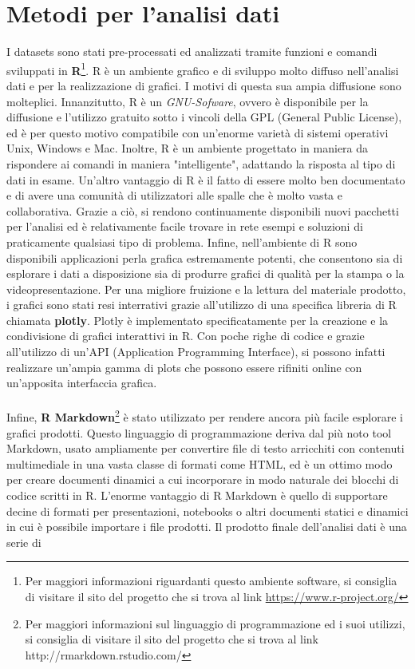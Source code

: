 \documentclass[a4paper,10pt]{scrartcl}
\begin{document}
\section{Metodi per l'analisi dati}
I datasets sono stati pre-processati ed analizzati tramite funzioni e comandi sviluppati in \textbf{R}\footnote{Per maggiori informazioni riguardanti questo ambiente software, si consiglia di visitare il sito del progetto che si trova al link \url{https://www.r-project.org/}}. R è un ambiente grafico e di sviluppo molto diffuso nell'analisi dati e per la realizzazione di grafici. I motivi di questa sua ampia diffusione sono molteplici. Innanzitutto, R è un \textit{GNU-Sofware}, ovvero è disponibile per la diffusione e l'utilizzo gratuito sotto i vincoli della GPL (General Public License), ed è per questo motivo compatibile con un'enorme varietà di sistemi operativi Unix, Windows e Mac. Inoltre, R è un ambiente progettato in maniera da rispondere ai comandi in maniera "intelligente", adattando la risposta al tipo di dati in esame. Un'altro vantaggio di R è il fatto di essere molto ben documentato e di avere una comunità di utilizzatori alle spalle che è molto vasta e collaborativa. Grazie a ciò, si rendono continuamente disponibili nuovi pacchetti per l'analisi ed è relativamente facile trovare in rete esempi e soluzioni di praticamente qualsiasi tipo di problema. Infine, nell'ambiente di R sono disponibili applicazioni perla grafica estremamente potenti, che consentono sia di esplorare i dati a disposizione sia di produrre grafici di qualità per la stampa o la videopresentazione. Per una migliore fruizione e la lettura del materiale prodotto, i grafici sono stati resi interrativi grazie all'utilizzo di una specifica libreria di R chiamata \textbf{plotly}. Plotly è implementato specificatamente per la creazione e la condivisione di grafici interattivi in R. Con poche righe di codice e grazie all'utilizzo di un'API (Application Programming Interface), si possono infatti realizzare un'ampia gamma di plots che possono essere rifiniti online con un'apposita interfaccia grafica.
\\ \\
Infine, \textbf{R Markdown}\footnote{Per maggiori informazioni sul linguaggio di programmazione ed i suoi utilizzi, si consiglia di visitare il sito del progetto che si trova al link http://rmarkdown.rstudio.com/} è stato utilizzato per rendere ancora più facile esplorare i grafici prodotti. Questo linguaggio di programmazione deriva dal più noto tool Markdown, usato ampliamente per convertire file di testo arricchiti con contenuti multimediale in una vasta classe di formati come HTML, ed è un ottimo modo per creare documenti dinamici a cui incorporare in modo naturale dei blocchi di codice scritti in R. L'enorme vantaggio di R Markdown è quello di supportare decine di formati per presentazioni, notebooks o altri documenti statici e dinamici in cui è possibile importare i file prodotti. Il prodotto finale dell'analisi dati è una serie di   
\end{document}
